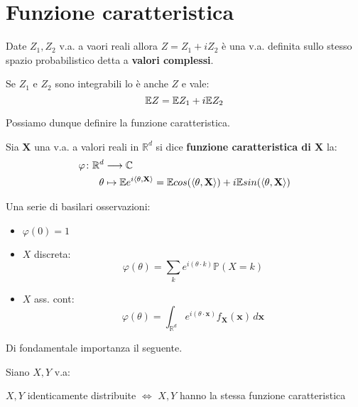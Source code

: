 \section{Funzione caratteristica}

\begin{definition}
Date $Z_1,Z_2$ v.a. a vaori reali allora $Z=Z_1+iZ_2$ è una v.a. definita sullo stesso spazio probabilistico detta a \textbf{valori complessi}.
\end{definition}

\vspace{5px}

\begin{observation}
Se $Z_1$ e $Z_2$ sono integrabili lo è anche $Z$ e vale: \[\mathbb{E} Z=\mathbb{E} Z_1 +i\mathbb{E} Z_2\]
\end{observation}

\vspace{10px}

Possiamo dunque definire la funzione caratteristica.
\begin{definition}
Sia $\textbf{X}$ una v.a. a valori reali in $\mathbb{R}^d$ si dice \textbf{funzione caratteristica di \textbf{X}} la: 
\begin{align*}
    \varphi\colon \mathbb{R}^d & \longrightarrow \mathbb{C} \\
    \theta&\mapsto \mathbb{E} e^{i\langle\theta,\textbf{X}\rangle} = \mathbb{E} cos(\langle\theta,\textbf{X}\rangle) + i\mathbb{E} sin(\langle\theta,\textbf{X}\rangle)
\end{align*}
\end{definition}

\vspace{5px}

Una serie di basilari osservazioni:
\begin{itemize}
    \item $\varphi(0)=1$
    \item $X$ discreta: \[\varphi(\theta)=\sum_k e^{i(\theta\cdot k)}\mathbb{P}(X=k)\]
    \item $X$ ass. cont: \[\varphi(\theta)=\int_{\mathbb{R}^d}e^{i(\theta\cdot \textbf{x})}f_\textbf{X}(\textbf{x}) \,d\textbf{x}\]
\end{itemize}

\vspace{15px}

Di fondamentale importanza il seguente.

\begin{theorem}
Siano $X,Y$ v.a:
\begin{center}
    $X,Y$ identicamente distribuite $\Longleftrightarrow$ $X,Y$ hanno la stessa funzione caratteristica
\end{center}
\end{theorem}

